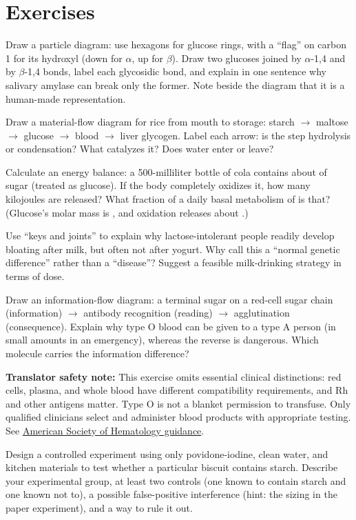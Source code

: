 \section*{Exercises}

\begin{sikaoti}
\item Draw a particle diagram: use hexagons for glucose rings, with a ``flag'' on carbon 1 for its hydroxyl (down for $\alpha$, up for $\beta$). Draw two glucoses joined by $\alpha$-1,4 and by $\beta$-1,4 bonds, label each glycosidic bond, and explain in one sentence why salivary amylase can break only the former. Note beside the diagram that it is a human-made representation.
\item Draw a material-flow diagram for rice from mouth to storage: starch $\rightarrow$ maltose $\rightarrow$ glucose $\rightarrow$ blood $\rightarrow$ liver glycogen. Label each arrow: is the step hydrolysis or condensation? What catalyzes it? Does water enter or leave?
\item Calculate an energy balance: a 500-milliliter bottle of cola contains about  of sugar (treated as glucose). If the body completely oxidizes it, how many kilojoules are released? What fraction of a daily basal metabolism of  is that? (Glucose's molar mass is , and oxidation releases about .)
\item Use ``keys and joints'' to explain why lactose-intolerant people readily develop bloating after milk, but often not after yogurt. Why call this a ``normal genetic difference'' rather than a ``disease''? Suggest a feasible milk-drinking strategy in terms of dose.
\item Draw an information-flow diagram: a terminal sugar on a red-cell sugar chain (information) $\rightarrow$ antibody recognition (reading) $\rightarrow$ agglutination (consequence). Explain why type O blood can be given to a type A person (in small amounts in an emergency), whereas the reverse is dangerous. Which molecule carries the information difference?

\textbf{Translator safety note:} This exercise omits essential clinical distinctions: red cells, plasma, and whole blood have different compatibility requirements, and Rh and other antigens matter. Type O is not a blanket permission to transfuse. Only qualified clinicians select and administer blood products with appropriate testing. See \href{https://www.hematology.org/education/patients/blood-basics/blood-safety-and-matching}{American Society of Hematology guidance}.
\item Design a controlled experiment using only povidone-iodine, clean water, and kitchen materials to test whether a particular biscuit contains starch. Describe your experimental group, at least two controls (one known to contain starch and one known not to), a possible false-positive interference (hint: the sizing in the paper experiment), and a way to rule it out.
\end{sikaoti}
